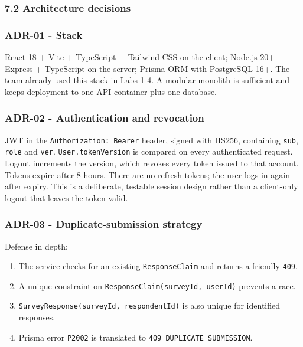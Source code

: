 \documentclass[12pt,a4paper]{article}
\begin{document}
\subsubsection*{7.2 Architecture decisions}
\subsubsection*{ADR-01 - Stack}
React 18 + Vite + TypeScript + Tailwind CSS on the client; Node.js 20+ + Express + TypeScript on the server; Prisma ORM with PostgreSQL 16+. The team already used this stack in Labs 1-4. A modular monolith is sufficient and keeps deployment to one API container plus one database.

\subsubsection*{ADR-02 - Authentication and revocation}
JWT in the \texttt{Authorization: Bearer} header, signed with HS256, containing \texttt{sub}, \texttt{role} and \texttt{ver}. \texttt{User.tokenVersion} is compared on every authenticated request. Logout increments the version, which revokes every token issued to that account. Tokens expire after 8 hours. There are no refresh tokens; the user logs in again after expiry. This is a deliberate, testable session design rather than a client-only logout that leaves the token valid.

\subsubsection*{ADR-03 - Duplicate-submission strategy}
Defense in depth:

\begin{enumerate}[leftmargin=*]
\item The service checks for an existing \texttt{ResponseClaim} and returns a friendly \texttt{409}.
\item A unique constraint on \texttt{ResponseClaim(surveyId, userId)} prevents a race.
\item \texttt{SurveyResponse(surveyId, respondentId)} is also unique for identified responses.
\item Prisma error \texttt{P2002} is translated to \texttt{409 DUPLICATE\_SUBMISSION}.
\end{enumerate}
\end{document}
